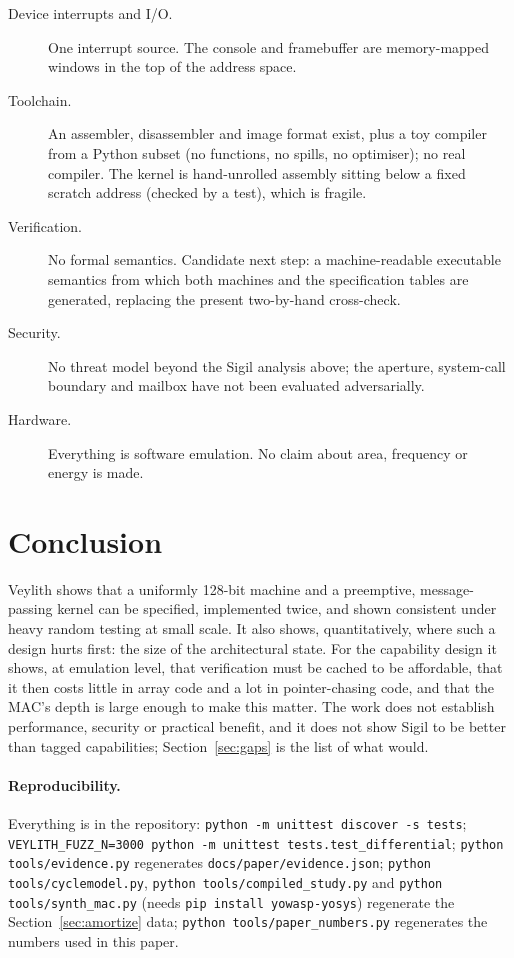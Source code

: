 \documentclass[10pt,a4paper]{article}
\begin{document}
\begin{description}
\item[Device interrupts and I/O.] One interrupt source. The console and framebuffer are memory-mapped windows in the top of the address space.
\item[Toolchain.] An assembler, disassembler and image format exist, plus a toy compiler from a Python subset (no functions, no spills, no optimiser); no real compiler. The kernel is hand-unrolled assembly sitting below a fixed scratch address (checked by a test), which is fragile.
\item[Verification.] No formal semantics. Candidate next step: a machine-readable executable semantics from which both machines and the specification tables are generated, replacing the present two-by-hand cross-check.
\item[Security.] No threat model beyond the Sigil analysis above; the aperture, system-call boundary and mailbox have not been evaluated adversarially.
\item[Hardware.] Everything is software emulation. No claim about area, frequency or energy is made.
\end{description}

\section{Conclusion}
Veylith shows that a uniformly 128-bit machine and a preemptive, message-passing kernel can be specified, implemented twice, and shown consistent under heavy random testing at small scale. It also shows, quantitatively, where such a design hurts first: the size of the architectural state. For the capability design it shows, at emulation level, that verification must be cached to be affordable, that it then costs little in array code and a lot in pointer-chasing code, and that the MAC's depth is large enough to make this matter. The work does not establish performance, security or practical benefit, and it does not show Sigil to be better than tagged capabilities; Section~\ref{sec:gaps} is the list of what would.

\paragraph{Reproducibility.} Everything is in the repository: \texttt{python -m unittest discover -s tests}; \texttt{VEYLITH\_FUZZ\_N=3000 python -m unittest tests.test\_differential}; \texttt{python tools/evidence.py} regenerates \texttt{docs/paper/evidence.json}; \texttt{python tools/cyclemodel.py}, \texttt{python tools/compiled\_study.py} and \texttt{python tools/synth\_mac.py} (needs \texttt{pip install yowasp-yosys}) regenerate the Section~\ref{sec:amortize} data; \texttt{python tools/paper\_numbers.py} regenerates the numbers used in this paper.
\end{document}

